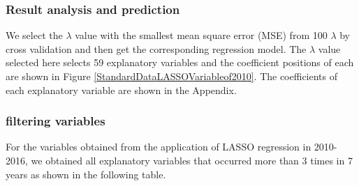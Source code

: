 \documentclass{mcmthesis}
\begin{document}
\subsubsection{Result analysis and prediction}
We select the $\lambda$ value with the smallest mean square error (MSE) from 100 $\lambda$ by cross validation and then get the corresponding regression model.  The $\lambda$ value selected here selects 59 explanatory variables and the coefficient positions of each are shown in Figure \ref{StandardDataLASSOVariableof2010}. The coefficients of each explanatory variable are shown in the Appendix.
 

\subsubsection{filtering variables}
For the variables obtained from the application of LASSO regression in 2010-2016, we obtained all explanatory variables that occurred more than 3 times in 7 years as shown in the following table.
\end{document}
